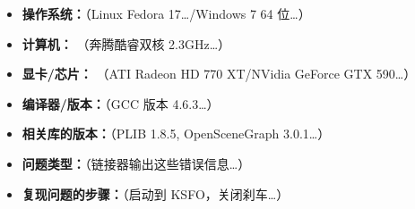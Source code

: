 \begin{itemize}
\ifchinese
\item \textbf{操作系统：}（Linux Fedora 17\ldots/Windows 7 64 位\ldots）
\item \textbf{计算机：} （奔腾酷睿双核 2.3GHz\ldots）
\item \textbf{显卡/芯片：} （ATI Radeon HD 770 XT/NVidia GeForce GTX 590\ldots）
\item \textbf{编译器/版本：}（GCC 版本 4.6.3\ldots）
\item \textbf{相关库的版本：}（PLIB 1.8.5, OpenSceneGraph 3.0.1\ldots）
\item \textbf{问题类型：}（链接器输出这些错误信息\ldots）
\item \textbf{复现问题的步骤：}（启动到 KSFO，关闭刹车\ldots）
\fi
\iffalse
\IfLanguageName{english}{
\item \textbf{Operating system:} (Linux Fedora 17\ldots/Windows Seven 64 bits\ldots)
\item \textbf{Computer:} (Pentium Dual Core, 2,3GHz\ldots)
\item \textbf{Graphics board/chip:} (ATI Radeon HD 770 XT/NVidia GeForce GTX 590\ldots)
\item \textbf{Compiler/version:} (GCC version 4.6.3\ldots)
\item \textbf{Versions of relevant libraries:} (PLIB 1.8.5, OpenSceneGraph 3.0.1\ldots)
\item \textbf{Type of problem:} (Linker dies with message\ldots)
\item \textbf{Steps to recreate the problem:} Start at KSFO, turn off brakes \ldots
}{}
\IfLanguageName{french}{
\item \textbf{Syst\`{e}me d'exploitation :} (Linux Fedora 17\ldots/Windows Seven 64 bits\ldots)
\item \textbf{Ordinateur :} (Pentium Dual Core, 2,3 GHz\ldots)
\item \textbf{Carte graphique/processeur :} (ATI Radeon HD 770 XT/Nvidia GeForce GTX 590\ldots)
\item \textbf{Compilateur/version :} (GCC version 4.6.3\ldots)
\item \textbf{Versions des librairies concern\'{e}es :} (PLIB 1.8.5, OpenSceneGraph 3.0.1\ldots)
\item \textbf{Type de probl\`{e}me :} (Le compilateur s'arr\^{e} avec le message suivant\ldots)
\item \textbf{Etapes pour reproduire le probl\`{e}me :} D\'{e}marrer \`{a} KSFO, l\^{a}cher les freins\ldots
}{}
\fi
\end{itemize}

